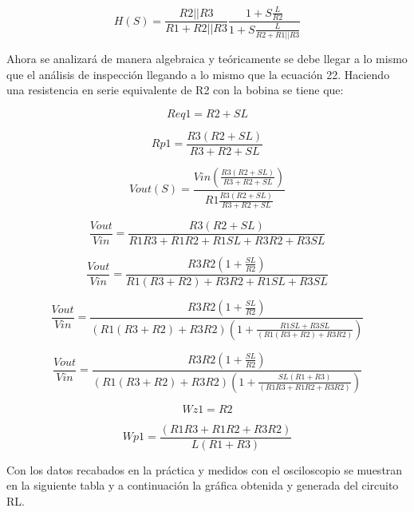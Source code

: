\documentclass[letterpaper,10pt]{article}
\begin{document}
     \begin{equation}
    H(S)= \frac{R2||R3}{R1+R2||R3}\frac{1+S\frac{L}{R2}}{1+S\frac{L}{R2+R1||R3}}
    \end{equation}
    
      
     	Ahora se analizará de manera algebraica y teóricamente se debe llegar a lo mismo que el análisis de inspección llegando a lo mismo que la ecuación 22.
	    Haciendo una resistencia en serie equivalente de R2 con la bobina se tiene que:
      
    \begin{equation}
    Req1 = R2 + SL
    \end{equation}
    
    \begin{equation}
    Rp1 = \frac{R3(R2 + SL)}{R3 + R2 + SL}
    \end{equation}
    
    \begin{equation}
    Vout (S) = \frac{Vin(\frac{R3(R2+SL)}{R3+R2+SL})}{R1\frac{R3(R2+SL)}{R3+R2+SL}} 
    \end{equation}

	\begin{equation}
	\frac{Vout}{Vin} = \frac{R3(R2+SL)}{R1R3+R1R2+R1SL+R3R2+R3SL}
	\end{equation}
	
	\begin{equation}
	\frac{Vout}{Vin} = \frac{R3R2(1+\frac{SL}{R2})}{R1(R3+R2)+R3R2+R1SL+R3SL}
	\end{equation}
	
	\begin{equation}
	\frac{Vout}{Vin} = \frac{R3R2(1+\frac{SL}{R2})}{(R1(R3+R2)+R3R2)(1+\frac{R1SL+R3SL}{(R1(R3+R2)+R3R2)})}
	\end{equation}	
	
	\begin{equation}
	\frac{Vout}{Vin} = \frac{R3R2(1+\frac{SL}{R2})}{(R1(R3+R2)+R3R2)(1+\frac{SL(R1+R3)}{(R1R3+R1R2+R3R2)})}
	\end{equation}
	
	\begin{equation}
	Wz1=R2
	\end{equation}
	
	\begin{equation}
	Wp1 = \frac{(R1R3+R1R2+R3R2)}{L(R1+R3)}
	\end{equation}
	
	\vspace*{0.4in}	
	    Con los datos recabados en la práctica y medidos con el osciloscopio se muestran en la siguiente tabla y a continuación la gráfica obtenida y generada del circuito RL.\\
   
\end{document}
